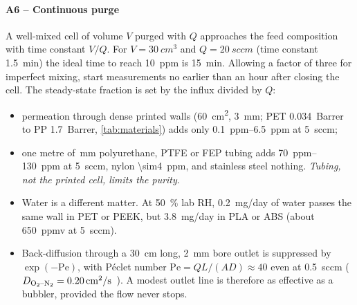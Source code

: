 \paragraph{A6 -- Continuous purge} A well-mixed cell of volume $V$ purged with $Q$ approaches the feed
composition with time constant $V/Q$. For $V=\SI{30}{cm^3}$ and $Q=\SI{20}{sccm}$ (time constant
\SI{1.5}{min}) the ideal time to reach \SI{10}{ppm} is \SI{15}{min}. Allowing a factor of three for
imperfect mixing, start measurements no earlier than an hour after closing the cell. The steady-state
\Oxy{} fraction is set by the influx divided by $Q$:
\begin{itemize}
  \item permeation through dense printed walls (\SI{60}{cm^2}, \SI{3}{mm}; PET \SI{0.034}{Barrer} to
        PP \SI{1.7}{Barrer}, \cref{tab:materials}) adds only \SIrange{0.1}{6.5}{ppm} at \SI{5}{sccm};
  \item one metre of \,mm polyurethane, PTFE or FEP tubing adds
        \SIrange{70}{130}{ppm} at \SI{5}{sccm}, nylon \SI{\sim4}{ppm}, and stainless steel nothing.
        \emph{Tubing, not the printed cell, limits the purity}.
  \item Water is a different matter. At \SI{50}{\percent} lab RH, \SI{0.2}{mg/day} of water passes the same
        wall in PET or PEEK, but \SI{3.8}{mg/day} in PLA or ABS (about \SI{650}{ppmv} at \SI{5}{sccm}).
  \item Back-diffusion through a \SI{30}{cm} long, \SI{2}{mm} bore outlet is suppressed by $\exp(-\mathrm{Pe})$,
        with Péclet number $\mathrm{Pe}=QL/(AD)\approx40$ even at \SI{0.5}{sccm} ($D_{\ce{O2}\text{--}\ce{N2}}=\SI{0.20}{cm^2/s}$~\cite{Marrero1972}). A modest outlet line
        is therefore as effective as a bubbler, provided the flow never stops.
\end{itemize}


